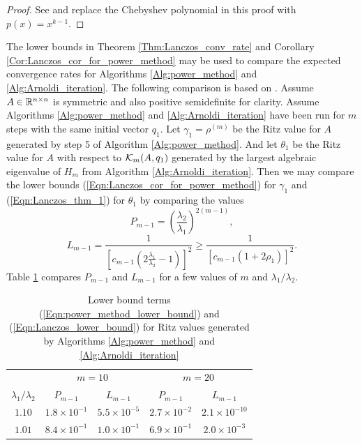\begin{enumerate}
\begin{proof}
See \cite[Theorem 10.1.2]{golub2012matrix} and replace the Chebyshev polynomial in this proof with $p(x) = x^{k-1}$.
\end{proof}


The lower bounds in Theorem \ref{Thm:Lanczos_conv_rate} and Corollary \ref{Cor:Lanczos_cor_for_power_method} may be used to compare the expected convergence rates for Algorithms \ref{Alg:power_method} and \ref{Alg:Arnoldi_iteration}.  The following comparison is based on \cite[Section 10.1.6]{golub2012matrix}.  Assume $A \in {\mathbb R}^{n \times n}$ is symmetric and also positive semidefinite for clarity.  Assume Algorithms \ref{Alg:power_method} and \ref{Alg:Arnoldi_iteration} have been run for $m$ steps with the same initial vector $q_1$.  Let $\gamma_1 = \rho^{(m)}$ be the Ritz value for $A$ generated by step 5 of Algorithm \ref{Alg:power_method}.  And let $\theta_1$ be the Ritz value for $A$ with respect to ${\mathcal K}_m(A, q_1)$ generated by the largest algebraic eigenvalue of $H_m$ from Algorithm \ref{Alg:Arnoldi_iteration}.  Then we may compare the lower bounds (\ref{Eqn:Lanczos_cor_for_power_method}) for $\gamma_1$ and (\ref{Eqn:Lanczos_thm_1}) for $\theta_1$ by comparing the values
\begin{equation} 		\label{Eqn:power_method_lower_bound}
P_{m-1} = \left( \frac{\lambda_2}{\lambda_1} \right)^{2(m-1)},
\end{equation}
\begin{equation}  	\label{Eqn:Lanczos_lower_bound}
L_{m-1} 
	= \frac{1}{\left[c_{m-1}\left(2\frac{\lambda_1}{\lambda_2} -1 \right)\right]^2} 
	\geq 	\frac{1}{\left[ c_{m-1}\left( 1 + 2 \rho_1 \right) \right]^2}.
\end{equation}
Table \ref{Tab:Lanczos_vs_power_method} compares $P_{m-1}$ and $L_{m-1}$ for a few values of $m$ and $\lambda_1/\lambda_2$.

\begin{table}[H]
\centering
\begin{tabular}{ |c|cc|cc| }
 \hline

 	&	\multicolumn{2}{c|}{$m = 10$}
 		&	\multicolumn{2}{c|}{$m = 20$}	\\
 $\lambda_1 / \lambda_2$	&	$P_{m-1}$	&	$L_{m-1}$
 		&	$P_{m-1}$	&	$L_{m-1}$		\\ 			
 \hline
$1.10$
	&	$1.8 \times 10^{-1}$ & $5.5 \times 10^{-5}$
		&	$2.7 \times 10^{-2}$ & $2.1 \times 10^{-10}$	\\
$1.01$
	&	$8.4 \times 10^{-1}$ & $1.0 \times 10^{-1}$
		&	$6.9 \times 10^{-1}$ & $2.0 \times 10^{-3}$	\\
 \hline
\end{tabular}
\caption{Lower bound terms (\ref{Eqn:power_method_lower_bound}) and (\ref{Eqn:Lanczos_lower_bound}) for Ritz values generated by Algorithms \ref{Alg:power_method} and \ref{Alg:Arnoldi_iteration} } \label{Tab:Lanczos_vs_power_method}
\end{table}


\end{enumerate}
